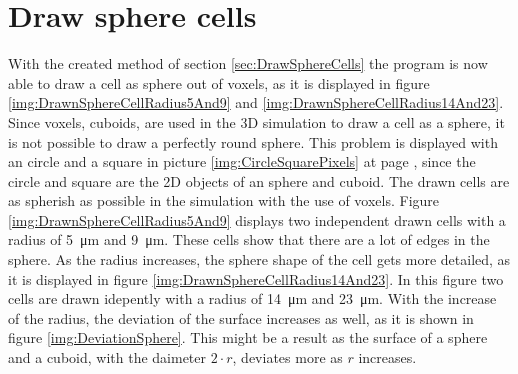 \section{Draw sphere cells}
With the created method of section \ref{sec:DrawSphereCells} the program is now able to draw a cell as sphere out of
voxels, as it is displayed in figure \ref{img:DrawnSphereCellRadius5And9} and \ref{img:DrawnSphereCellRadius14And23}. \newline
Since voxels, cuboids, are used in the 3D simulation to draw a cell as a sphere, it is not possible to draw a perfectly round sphere. This problem is displayed with an circle and a square in picture \ref{img:CircleSquarePixels} at page \pageref{img:CircleSquarePixels}, since the circle and square are the 2D objects of an sphere and cuboid. The drawn cells are as spherish as possible in the simulation with the use of voxels. \newline
Figure \ref{img:DrawnSphereCellRadius5And9} displays two independent drawn cells with a radius of \SI{5}{\micro\metre} and \SI{9}{\micro\metre}. These cells show that there are a lot of edges in the sphere. As the radius increases, the sphere shape of the cell gets more detailed, as it is displayed in figure \ref{img:DrawnSphereCellRadius14And23}. In this figure two cells are drawn idepently with a radius of \SI{14}{\micro\metre} and \SI{23}{\micro\metre}. With the increase of the radius, the deviation of the surface increases as well, as it is shown in figure \ref{img:DeviationSphere}. This might be a result as the surface of a sphere and a cuboid, with the daimeter $2 \cdot r$, deviates more as $r$ increases.

